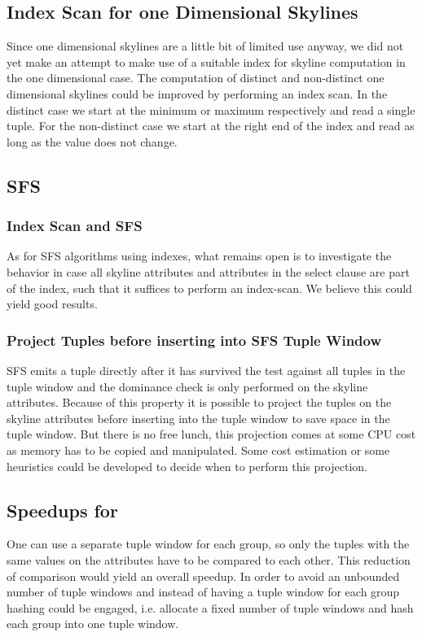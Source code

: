 \subsection{Index Scan for one Dimensional Skylines}
\label{sec:index-scan-for-1dim}
Since one dimensional skylines are a little bit of limited use anyway,
we did not yet make an attempt to make use of a suitable index for
skyline computation in the one dimensional case. The computation of
distinct and non-distinct one dimensional skylines could be improved by
performing an index scan. In the distinct case we start at the minimum or
maximum respectively and read a single tuple. For the non-distinct case
we start at the right end of the index and read as long as the value does
not change.


\subsection{SFS}
\subsubsection{Index Scan and SFS}
As for SFS algorithms using indexes, what remains open is to
investigate the behavior in case all skyline attributes and attributes
in the select clause are part of the index, such that it suffices
to perform an index-scan.  We believe this could
yield good results.


\subsubsection{Project Tuples before inserting into SFS Tuple Window}
SFS emits a tuple directly after it has survived the test against all
tuples in the tuple window and the dominance check is only performed
on the skyline attributes.  Because of this property it is possible to
project the tuples on the skyline attributes before inserting
into the tuple window to save space in the tuple window.  But there is
no free lunch, this projection comes at some CPU cost as memory has
to be copied and manipulated.  Some cost estimation or some heuristics
could be developed to decide when to perform this projection.


\subsection{Speedups for }
\label{sec:speedup-skyline-diff}
%
One can use a separate tuple window for each 
group, so only the tuples with the same values on the
 attributes have to be compared to each
other. This reduction of comparison would yield an overall speedup.
In order to avoid an unbounded number of tuple windows and instead of
having a tuple window for each  group
hashing could be engaged, i.e. allocate a fixed number of tuple
windows and hash each  group into one tuple
window.

